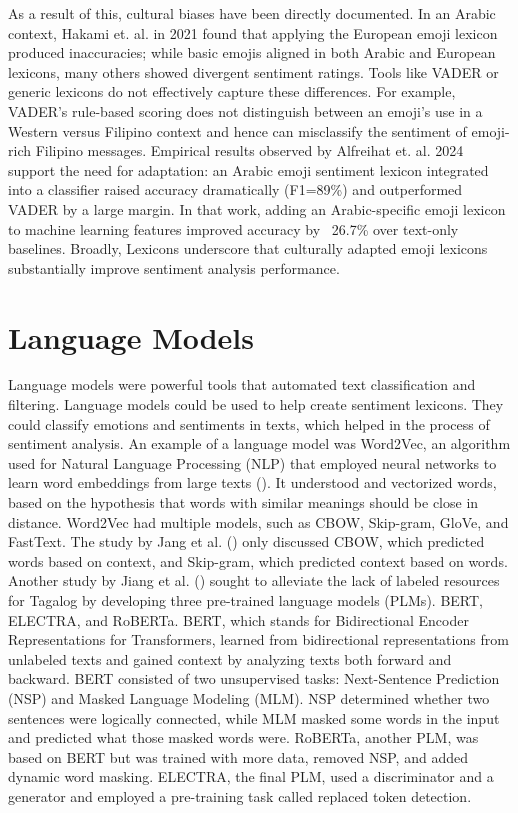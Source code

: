 As a result of this, cultural biases have been directly documented. In an Arabic context, Hakami et. al. in 2021 found that applying the European emoji lexicon produced inaccuracies; while basic emojis aligned in both Arabic and European lexicons, many others showed divergent sentiment ratings. Tools like VADER or generic lexicons do not effectively capture these differences. For example, VADER's rule-based scoring does not distinguish between an emoji's use in a Western versus Filipino context and hence can misclassify the sentiment of emoji-rich Filipino messages. Empirical results observed by Alfreihat et. al. 2024 support the need for adaptation: an Arabic emoji sentiment lexicon integrated into a classifier raised accuracy dramatically (F1=89\%) and outperformed VADER by a large margin. In that work, adding an Arabic-specific emoji lexicon to machine learning features improved accuracy by ~26.7\% over text-only baselines. Broadly, Lexicons underscore that culturally adapted emoji lexicons substantially improve sentiment analysis performance.



\section{Language Models}

Language models were powerful tools that automated text classification and filtering. Language models could be used to help create sentiment lexicons. They could classify emotions and sentiments in texts, which helped in the process of sentiment analysis. An example of a language model was Word2Vec, an algorithm used for Natural Language Processing (NLP) that employed neural networks to learn word embeddings from large texts (\citeyear{Jang2019}). It understood and vectorized words, based on the hypothesis that words with similar meanings should be close in distance. Word2Vec had multiple models, such as CBOW, Skip-gram, GloVe, and FastText. The study by Jang et al. (\citeyear{Jang2019}) only discussed CBOW, which predicted words based on context, and Skip-gram, which predicted context based on words. Another study by Jiang et al. (\citeyear{Jiang2021}) sought to alleviate the lack of labeled resources for Tagalog by developing three pre-trained language models (PLMs). BERT, ELECTRA, and RoBERTa. BERT, which stands for Bidirectional Encoder Representations for Transformers, learned from bidirectional representations from unlabeled texts and gained context by analyzing texts both forward and backward. BERT consisted of two unsupervised tasks: Next-Sentence Prediction (NSP) and Masked Language Modeling (MLM). NSP determined whether two sentences were logically connected, while MLM masked some words in the input and predicted what those masked words were. RoBERTa, another PLM, was based on BERT but was trained with more data, removed NSP, and added dynamic word masking. ELECTRA, the final PLM, used a discriminator and a generator and employed a pre-training task called replaced token detection.




